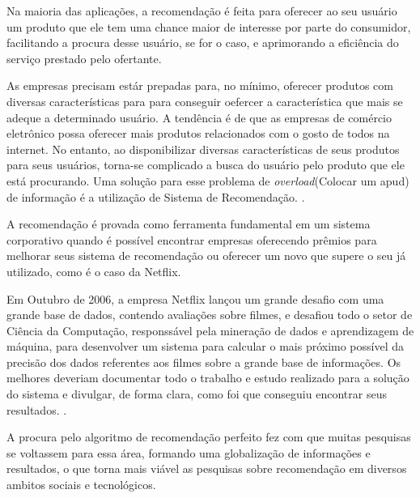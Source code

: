 \documentclass[12pt,
				openright,
				twoside,
				a4paper,
				apter=TITLE,
				section=TITLE,
				subsection=TITLE,
				chapter=TITLE,
				english,
				french,
				spanish,
				brazil]{abntex2}
\begin{document}
Na maioria das aplicações, a recomendação é feita para oferecer ao seu usuário um produto que ele tem uma chance maior de interesse por parte do consumidor, facilitando a procura desse usuário, se for o caso, e aprimorando a eficiência do serviço prestado pelo ofertante.

\begin{citacao}
As empresas precisam estár prepadas para, no mínimo, oferecer produtos com diversas características para para conseguir oefercer a característica que mais se adeque a determinado usuário. A tendência é de que as empresas de comércio eletrônico possa oferecer mais produtos relacionados com o gosto de todos na internet. No entanto, ao disponibilizar diversas características de seus produtos para seus usuários, torna-se complicado a busca do usuário pelo produto que ele está procurando. Uma solução para esse problema de \textit{overload}(Colocar um apud) de informação é a utilização de Sistema de Recomendação.  
\cite[4.0]{schafer1999recommender}.
\end{citacao}

A recomendação é provada como ferramenta fundamental em um sistema corporativo quando é possível encontrar empresas oferecendo prêmios para melhorar seus sistema de recomendação ou oferecer um novo que supere o seu já utilizado, como é o caso da Netflix.

\begin{citacao}
Em Outubro de 2006, a empresa Netflix lançou um grande desafio com uma grande base de dados, contendo avaliações sobre filmes, e desafiou todo o setor de Ciência da Computação, responssável pela mineração de dados e aprendizagem de máquina, para desenvolver um sistema para calcular o mais próximo possível da precisão dos dados referentes aos filmes sobre a grande base de informações. Os melhores deveriam documentar todo o trabalho e estudo realizado para a solução do sistema e divulgar, de forma clara, como foi que conseguiu encontrar seus resultados. 
\cite[4.0]{bennett2007netflix}.
\end{citacao}

A procura pelo algoritmo de recomendação perfeito fez com que muitas pesquisas se voltassem para essa área, formando uma globalização de informações e resultados, o que torna mais viável as pesquisas sobre recomendação em diversos ambitos sociais e tecnológicos. 

\end{document}
